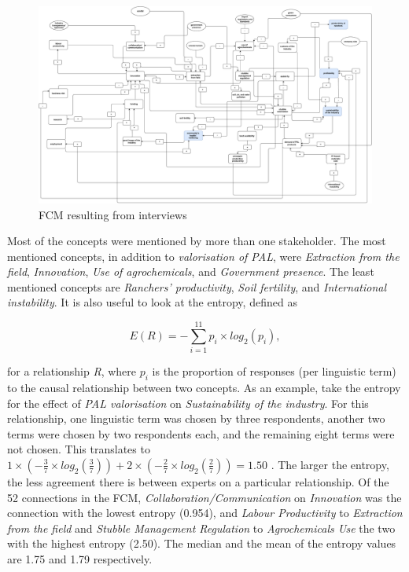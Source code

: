 \newpage

\begin{landscape}
\begin{figure}[H]
\caption{FCM resulting from interviews}  
\label{FCMdiagram}
\centering
\includegraphics[width=23 cm]{fig/diagram.drawio.pdf}
\end{figure}
\end{landscape}

\clearpage

Most of the concepts were mentioned by more than one stakeholder. The most mentioned concepts, in addition to \textit{valorisation of PAL}, were \textit{Extraction from the field}, \textit{Innovation}, \textit{Use of agrochemicals}, and \textit{Government presence}. The least mentioned concepts are \textit{Ranchers' productivity}, \textit{Soil fertility}, and \textit{International instability}. It is also useful to look at the entropy, defined as 

\begin{equation}
\label{entropyEq}
E(R) = - \sum_{i=1}^{11} p_i \times log_2(p_i),   
\end{equation}

for a relationship \textit{R}, where $p_i$ is the proportion of responses (per linguistic term) to the causal relationship between two concepts. As an example, take the entropy for the effect of \textit{PAL valorisation} on \textit{Sustainability of the industry}. For this relationship, one linguistic term was chosen by three respondents, another two terms were chosen by two respondents each, and the remaining eight terms were not chosen. This translates to $1 \times (- \frac{3}{7} \times log_2(\frac{3}{7})) + 2 \times (- \frac{2}{7} \times log_2(\frac{2}{7})) = 1.50 $ . The larger the entropy, the less agreement there is between experts on a particular relationship. Of the 52 connections in the FCM,  \textit{Collaboration/Communication} on \textit{Innovation} was the connection with the lowest entropy (0.954), and \textit{Labour Productivity} to \textit{Extraction from the field} and \textit{Stubble Management Regulation} to \textit{Agrochemicals Use} the two with the highest entropy (2.50). The median and the mean of the entropy values are 1.75 and 1.79 respectively. 

